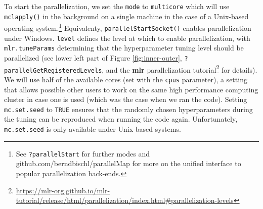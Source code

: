 \documentclass[]{krantz}
\newenvironment{Shaded}{\begin{snugshade}}{\end{snugshade}}
\newcommand{\CommentTok}[1]{\textcolor[rgb]{0.37,0.37,0.37}{\textit{#1}}}
\newcommand{\ControlFlowTok}[1]{\textcolor[rgb]{0.27,0.27,0.27}{\textbf{#1}}}
\newcommand{\DataTypeTok}[1]{\textcolor[rgb]{0.27,0.27,0.27}{#1}}
\newcommand{\DecValTok}[1]{\textcolor[rgb]{0.06,0.06,0.06}{#1}}
\newcommand{\KeywordTok}[1]{\textcolor[rgb]{0.27,0.27,0.27}{\textbf{#1}}}
\newcommand{\NormalTok}[1]{#1}
\newcommand{\OperatorTok}[1]{\textcolor[rgb]{0.43,0.43,0.43}{\textbf{#1}}}
\newcommand{\OtherTok}[1]{\textcolor[rgb]{0.37,0.37,0.37}{#1}}
\newcommand{\StringTok}[1]{\textcolor[rgb]{0.5,0.5,0.5}{#1}}
\let\rmarkdownfootnote\footnote%
\def\footnote{\protect\rmarkdownfootnote}
\renewcommand{\href}[2]{#2\footnote{\url{#1}}}
\begin{document}
To start the parallelization, we set the \texttt{mode} to \texttt{multicore} which will use \texttt{mclapply()} in the background on a single machine in the case of a Unix-based operating system.\footnote{See \texttt{?parallelStart} for further modes and github.com/berndbischl/parallelMap for more on the unified interface to popular parallelization back-ends.}
Equivalenty, \texttt{parallelStartSocket()} enables parallelization under Windows.
\texttt{level} defines the level at which to enable parallelization, with \texttt{mlr.tuneParams} determining that the hyperparameter tuning level should be parallelized (see lower left part of Figure \ref{fig:inner-outer}, \texttt{?parallelGetRegisteredLevels}, and the \textbf{mlr} \href{https://mlr-org.github.io/mlr-tutorial/release/html/parallelization/index.html\#parallelization-levels}{parallelization tutorial} for details).
We will use half of the available cores (set with the \texttt{cpus} parameter), a setting that allows possible other users to work on the same high performance computing cluster in case one is used (which was the case when we ran the code).
Setting \texttt{mc.set.seed} to \texttt{TRUE} ensures that the randomly chosen hyperparameters during the tuning can be reproduced when running the code again.
Unfortunately, \texttt{mc.set.seed} is only available under Unix-based systems.

\begin{Shaded}
\end{Shaded}
\end{document}

